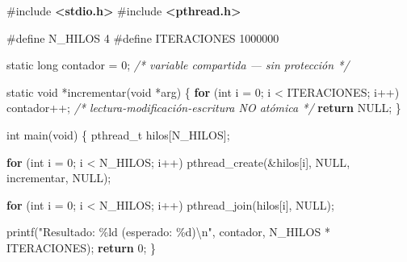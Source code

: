 \documentclass[
  spanish,
]{article}
\newenvironment{Shaded}{}{}
\newcommand{\CommentTok}[1]{\textcolor[rgb]{0.38,0.63,0.69}{\textit{#1}}}
\newcommand{\ControlFlowTok}[1]{\textcolor[rgb]{0.00,0.44,0.13}{\textbf{#1}}}
\newcommand{\DataTypeTok}[1]{\textcolor[rgb]{0.56,0.13,0.00}{#1}}
\newcommand{\DecValTok}[1]{\textcolor[rgb]{0.25,0.63,0.44}{#1}}
\newcommand{\ImportTok}[1]{\textcolor[rgb]{0.00,0.50,0.00}{\textbf{#1}}}
\newcommand{\NormalTok}[1]{#1}
\newcommand{\OperatorTok}[1]{\textcolor[rgb]{0.40,0.40,0.40}{#1}}
\newcommand{\PreprocessorTok}[1]{\textcolor[rgb]{0.74,0.48,0.00}{#1}}
\newcommand{\SpecialCharTok}[1]{\textcolor[rgb]{0.25,0.44,0.63}{#1}}
\newcommand{\StringTok}[1]{\textcolor[rgb]{0.25,0.44,0.63}{#1}}
\begin{document}
\begin{Shaded}
\begin{Highlighting}[]
\PreprocessorTok{\#include }\ImportTok{\textless{}stdio.h\textgreater{}}
\PreprocessorTok{\#include }\ImportTok{\textless{}pthread.h\textgreater{}}

\PreprocessorTok{\#define N\_HILOS    }\DecValTok{4}
\PreprocessorTok{\#define ITERACIONES }\DecValTok{1000000}

\DataTypeTok{static} \DataTypeTok{long}\NormalTok{ contador }\OperatorTok{=} \DecValTok{0}\OperatorTok{;}   \CommentTok{/* variable compartida — sin protección */}

\DataTypeTok{static} \DataTypeTok{void} \OperatorTok{*}\NormalTok{incrementar}\OperatorTok{(}\DataTypeTok{void} \OperatorTok{*}\NormalTok{arg}\OperatorTok{)} \OperatorTok{\{}
    \ControlFlowTok{for} \OperatorTok{(}\DataTypeTok{int}\NormalTok{ i }\OperatorTok{=} \DecValTok{0}\OperatorTok{;}\NormalTok{ i }\OperatorTok{\textless{}}\NormalTok{ ITERACIONES}\OperatorTok{;}\NormalTok{ i}\OperatorTok{++)}
\NormalTok{        contador}\OperatorTok{++;}          \CommentTok{/* lectura{-}modificación{-}escritura NO atómica */}
    \ControlFlowTok{return}\NormalTok{ NULL}\OperatorTok{;}
\OperatorTok{\}}

\DataTypeTok{int}\NormalTok{ main}\OperatorTok{(}\DataTypeTok{void}\OperatorTok{)} \OperatorTok{\{}
\NormalTok{    pthread\_t hilos}\OperatorTok{[}\NormalTok{N\_HILOS}\OperatorTok{];}

    \ControlFlowTok{for} \OperatorTok{(}\DataTypeTok{int}\NormalTok{ i }\OperatorTok{=} \DecValTok{0}\OperatorTok{;}\NormalTok{ i }\OperatorTok{\textless{}}\NormalTok{ N\_HILOS}\OperatorTok{;}\NormalTok{ i}\OperatorTok{++)}
\NormalTok{        pthread\_create}\OperatorTok{(\&}\NormalTok{hilos}\OperatorTok{[}\NormalTok{i}\OperatorTok{],}\NormalTok{ NULL}\OperatorTok{,}\NormalTok{ incrementar}\OperatorTok{,}\NormalTok{ NULL}\OperatorTok{);}

    \ControlFlowTok{for} \OperatorTok{(}\DataTypeTok{int}\NormalTok{ i }\OperatorTok{=} \DecValTok{0}\OperatorTok{;}\NormalTok{ i }\OperatorTok{\textless{}}\NormalTok{ N\_HILOS}\OperatorTok{;}\NormalTok{ i}\OperatorTok{++)}
\NormalTok{        pthread\_join}\OperatorTok{(}\NormalTok{hilos}\OperatorTok{[}\NormalTok{i}\OperatorTok{],}\NormalTok{ NULL}\OperatorTok{);}

\NormalTok{    printf}\OperatorTok{(}\StringTok{"Resultado: }\SpecialCharTok{\%ld}\StringTok{  (esperado: }\SpecialCharTok{\%d}\StringTok{)}\SpecialCharTok{\textbackslash{}n}\StringTok{"}\OperatorTok{,}
\NormalTok{           contador}\OperatorTok{,}\NormalTok{ N\_HILOS }\OperatorTok{*}\NormalTok{ ITERACIONES}\OperatorTok{);}
    \ControlFlowTok{return} \DecValTok{0}\OperatorTok{;}
\OperatorTok{\}}
\end{Highlighting}
\end{Shaded}
\end{document}
